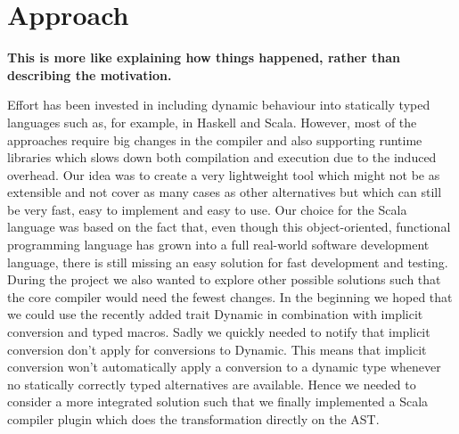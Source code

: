  \section{Approach}

\textbf{This is more like explaining how things happened, rather than describing the motivation.}

 Effort has been invested in including dynamic behaviour into statically typed languages such as, for example, in Haskell and Scala. However, most of the approaches require big changes in the compiler and also supporting runtime libraries which slows down both compilation and execution due to the induced overhead. Our idea was to create a very lightweight tool which might not be as extensible and not cover as many cases as other alternatives but which can still be very fast, easy to implement and easy to use. Our choice for the Scala language was based on the fact that, even though this object-oriented, functional programming language has grown into a full real-world software development language, there is still missing an easy solution for fast development and testing. During the project we also wanted to explore other possible solutions such that the core compiler would need the fewest changes. In the beginning we hoped that we could use the recently added trait {\ttfamily Dynamic} in combination with implicit conversion and typed macros. Sadly we quickly needed to notify that implicit conversion don't apply for conversions to Dynamic. This means that implicit conversion won't automatically apply a conversion to a dynamic type whenever no statically correctly typed alternatives are available. Hence we needed to consider a more integrated solution such that we finally implemented a Scala compiler plugin which does the transformation directly on the AST.
